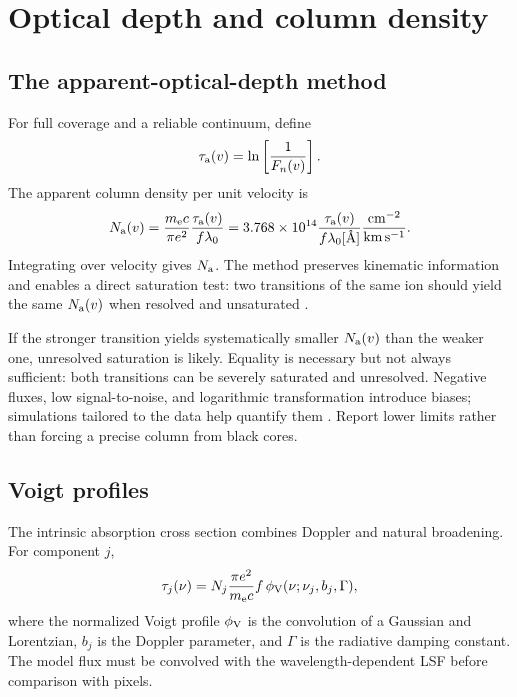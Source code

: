 \section{Optical depth and column density}

\subsection{The apparent-optical-depth method}

For full coverage and a reliable continuum, define
\begin{equation}
 \tau_{\rm a}(v)=\ln\left[\frac{1}{F_n(v)}\right].
 \label{eq:aod-tau}
\end{equation}
The apparent column density per unit velocity is
\begin{equation}
 N_{\rm a}(v)=
 \frac{m_{\rm e}c}{\pi e^2}\frac{\tau_{\rm a}(v)}{f\lambda_0}
 =3.768\times10^{14}
 \frac{\tau_{\rm a}(v)}
      {f\lambda_0[\text{\AA}]}
 \frac{{\rm cm^{-2}}}{{\rm km\,s^{-1}}}.
 \label{eq:abs-aod-column}
\end{equation}
Integrating over velocity gives $N_{\rm a}$. The method preserves kinematic
information and enables a direct saturation test: two transitions of the same
ion should yield the same $N_{\rm a}(v)$ when resolved and unsaturated
\citep{SavageSembach1991}.

If the stronger transition yields systematically smaller $N_{\rm a}(v)$ than
the weaker one, unresolved saturation is likely. Equality is necessary but
not always sufficient: both transitions can be severely saturated and
unresolved. Negative fluxes, low signal-to-noise, and logarithmic
transformation introduce biases; simulations tailored to the data help
quantify them \citep{Fox2005}. Report lower limits rather than forcing a
precise column from black cores.

\subsection{Voigt profiles}

The intrinsic absorption cross section combines Doppler and natural
broadening. For component $j$,
\begin{equation}
 \tau_j(\nu)=N_j\frac{\pi e^2}{m_{\rm e}c}f\,
 \phi_{\rm V}(\nu;\nu_j,b_j,\Gamma),
 \label{eq:voigt-tau}
\end{equation}
where the normalized Voigt profile $\phi_{\rm V}$ is the convolution of a
Gaussian and Lorentzian, $b_j$ is the Doppler parameter, and $\Gamma$ is the
radiative damping constant. The model flux must be convolved with the
wavelength-dependent LSF before comparison with pixels.

